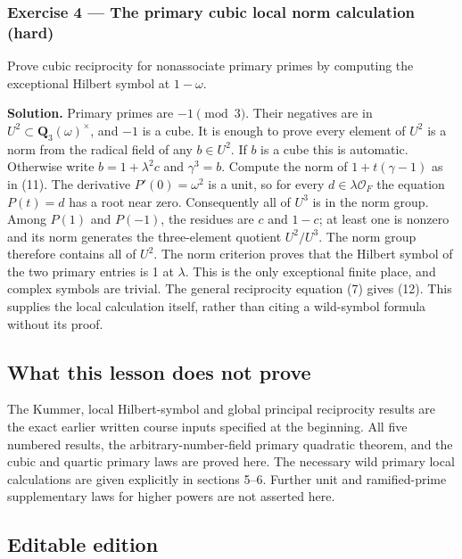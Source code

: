 \documentclass[11pt,a4paper]{article}
\begin{document}
\subsubsection{Exercise 4 --- The primary cubic local norm calculation
(hard)}\label{exercise-4-the-primary-cubic-local-norm-calculation-hard}

Prove cubic reciprocity for nonassociate primary primes by computing the
exceptional Hilbert symbol at \(1-\omega\).

\textbf{Solution.} Primary primes are \(-1\pmod3\). Their negatives are
in \(U^2\subset\mathbf Q_3(\omega)^\times\), and \(-1\) is a cube. It is
enough to prove every element of \(U^2\) is a norm from the radical
field of any \(b\in U^2\). If \(b\) is a cube this is automatic.
Otherwise write \(b=1+\lambda^2c\) and \(\gamma^3=b\). Compute the norm
of \(1+t(\gamma-1)\) as in (11). The derivative \(P'(0)=\omega^2\) is a
unit, so for every \(d\in\lambda\mathcal O_F\) the equation \(P(t)=d\)
has a root near zero. Consequently all of \(U^3\) is in the norm group.
Among \(P(1)\) and \(P(-1)\), the residues are \(c\) and \(1-c\); at
least one is nonzero and its norm generates the three-element quotient
\(U^2/U^3\). The norm group therefore contains all of \(U^2\). The norm
criterion proves that the Hilbert symbol of the two primary entries is 1
at \(\lambda\). This is the only exceptional finite place, and complex
symbols are trivial. The general reciprocity equation (7) gives (12).
This supplies the local calculation itself, rather than citing a
wild-symbol formula without its proof.

\subsection{What this lesson does not
prove}\label{what-this-lesson-does-not-prove}

The Kummer, local Hilbert-symbol and global principal reciprocity
results are the exact earlier written course inputs specified at the
beginning. All five numbered results, the arbitrary-number-field primary
quadratic theorem, and the cubic and quartic primary laws are proved
here. The necessary wild primary local calculations are given explicitly
in sections 5--6. Further unit and ramified-prime supplementary laws for
higher powers are not asserted here.

\subsection{Editable edition}\label{editable-edition}
\end{document}
